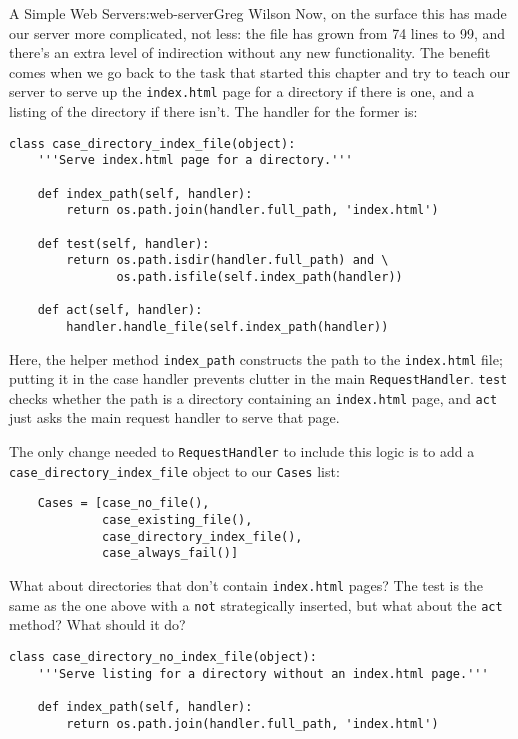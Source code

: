 \begin{aosachapter}{A Simple Web Server}{s:web-server}{Greg Wilson}
Now, on the surface this has made our server more complicated, not less:
the file has grown from 74 lines to 99, and there's an extra level of
indirection without any new functionality. The benefit comes when we go
back to the task that started this chapter and try to teach our server
to serve up the \texttt{index.html} page for a directory if there is
one, and a listing of the directory if there isn't. The handler for the
former is:

\begin{verbatim}
class case_directory_index_file(object):
    '''Serve index.html page for a directory.'''

    def index_path(self, handler):
        return os.path.join(handler.full_path, 'index.html')

    def test(self, handler):
        return os.path.isdir(handler.full_path) and \
               os.path.isfile(self.index_path(handler))

    def act(self, handler):
        handler.handle_file(self.index_path(handler))
\end{verbatim}

Here, the helper method \texttt{index\_path} constructs the path to the
\texttt{index.html} file; putting it in the case handler prevents
clutter in the main \texttt{RequestHandler}. \texttt{test} checks
whether the path is a directory containing an \texttt{index.html} page,
and \texttt{act} just asks the main request handler to serve that page.

The only change needed to \texttt{RequestHandler} to include this logic
is to add a \texttt{case\_directory\_index\_file} object to our
\texttt{Cases} list:

\begin{verbatim}
    Cases = [case_no_file(),
             case_existing_file(),
             case_directory_index_file(),
             case_always_fail()]
\end{verbatim}

What about directories that don't contain \texttt{index.html} pages? The
test is the same as the one above with a \texttt{not} strategically
inserted, but what about the \texttt{act} method? What should it do?

\begin{verbatim}
class case_directory_no_index_file(object):
    '''Serve listing for a directory without an index.html page.'''

    def index_path(self, handler):
        return os.path.join(handler.full_path, 'index.html')


\end{verbatim}
\end{aosachapter}
